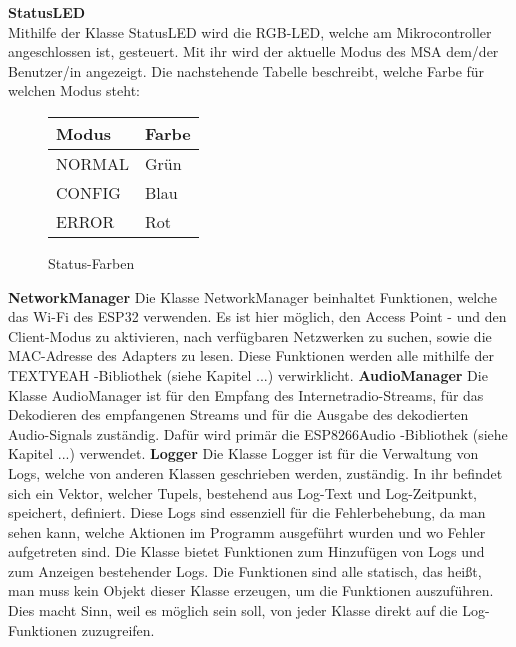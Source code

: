 \documentclass[11pt, twoside]{article}
\begin{document}
\textbf{StatusLED} \\
Mithilfe der Klasse \glqq StatusLED \grqq{} wird die RGB-LED, welche am Mikrocontroller angeschlossen ist, gesteuert. Mit ihr wird der aktuelle Modus des MSA dem/der Benutzer/in angezeigt. Die nachstehende Tabelle beschreibt, welche Farbe für welchen Modus steht: \newline \\
\begin{figure}[H]
	\centering
	\begin{tabular}{|l|l|}
		\hline
		\textbf{Modus} & \textbf{Farbe} \\
		\hline
		NORMAL & Grün \\
		\hline
		CONFIG & Blau \\
		\hline
		ERROR & Rot \\
		\hline
	\end{tabular}
	\caption{Status-Farben}
\end{figure}
\noindent %
\textbf{NetworkManager}\newline
Die Klasse \glqq NetworkManager \grqq{} beinhaltet Funktionen, welche das Wi-Fi des ESP32 verwenden. Es ist hier möglich, den Access Point - und den Client-Modus zu aktivieren, nach verfügbaren Netzwerken zu suchen, sowie die MAC-Adresse des Adapters zu lesen. Diese Funktionen werden alle mithilfe der \glqq TEXTYEAH \grqq{} -Bibliothek (siehe Kapitel ...) verwirklicht.
\vspace{4mm}\newline
\textbf{AudioManager}\newline
Die Klasse \glqq AudioManager \grqq{} ist für den Empfang des Internetradio-Streams, für das Dekodieren des empfangenen Streams und für die Ausgabe des dekodierten Audio-Signals zuständig. Dafür wird primär die \glqq ESP8266Audio \grqq{} -Bibliothek (siehe Kapitel ...) verwendet.
\vspace{4mm}\newline
\textbf{Logger}\newline
Die Klasse \glqq Logger \grqq{} ist für die Verwaltung von Logs, welche von anderen Klassen geschrieben werden, zuständig. In ihr befindet sich ein Vektor, welcher Tupels, bestehend aus Log-Text und Log-Zeitpunkt, speichert, definiert. Diese Logs sind essenziell für die Fehlerbehebung, da man sehen kann, welche Aktionen im Programm ausgeführt wurden und wo Fehler aufgetreten sind. Die Klasse bietet Funktionen zum Hinzufügen von Logs und zum Anzeigen bestehender Logs. Die Funktionen sind alle statisch, das heißt, man muss kein Objekt dieser Klasse erzeugen, um die Funktionen auszuführen. Dies macht Sinn, weil es möglich sein soll, von jeder Klasse direkt auf die Log-Funktionen zuzugreifen.
\end{document}
